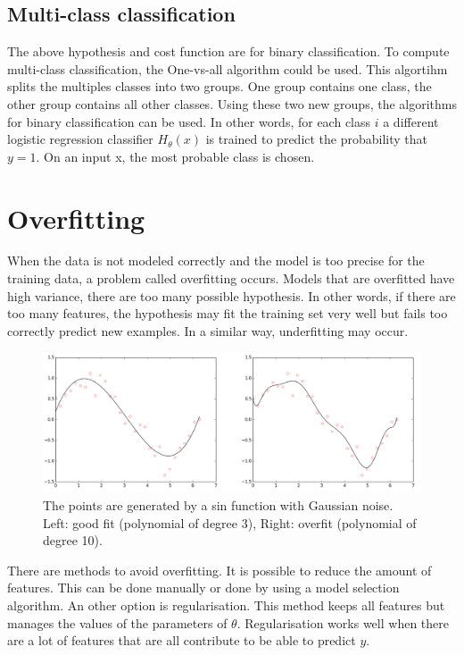 \subsection{Multi-class classification}
The above hypothesis and cost function are for binary classification. To compute multi-class classification, the One-vs-all algorithm could be used. This algortihm splits the multiples classes into two groups. One group contains one class, the other group contains all other classes. Using these two new groups, the algorithms for binary classification can be used. In other words, for each class $i$ a different logistic regression classifier $H_\theta(x)$ is trained to predict the probability that $y = 1$. On an input x, the most probable class is chosen.

\section{Overfitting}
When the data is not modeled correctly and the model is too precise for the training data, a problem called overfitting occurs. Models that are overfitted have high variance, there are too many possible hypothesis. In other words, if there are too many features, the hypothesis may fit the training set very well but fails too correctly predict new examples. In a similar way, underfitting may occur.
\begin{figure}[H]
\centering
\includegraphics[width=1.2\textwidth]{Figures/overfit}
\decoRule
\caption[Overfitting]{The points are generated by a sin function with Gaussian noise. Left: good fit (polynomial of degree 3), Right: overfit (polynomial of degree 10).}
\label{fig:overfitting}
\end{figure}
\noindent There are methods to avoid overfitting. It is possible to reduce the amount of features.  This can be done manually or done by using a model selection algorithm. An other option is regularisation. This method keeps all features but manages the values of the parameters of $\theta$.  Regularisation works well when there are a lot of features that are all contribute to be able to predict $y$.


